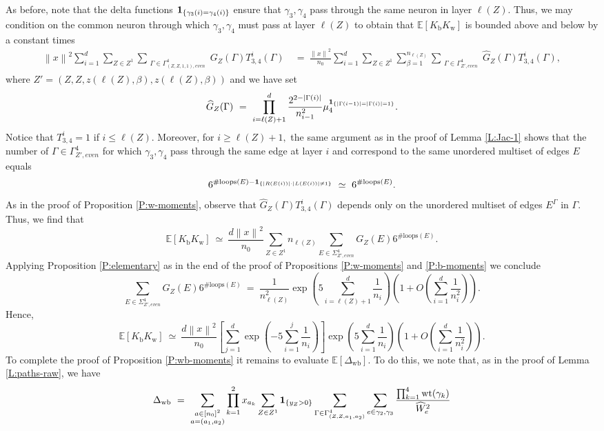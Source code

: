 \documentclass[11pt, reqno]{amsart}
\newcommand{\E}[1]{{\mathbb E}\left [#1\right]}
\newcommand{\abs}[1]{\ensuremath{\left| #1 \right|}}
\newcommand{\lr}[1]{\ensuremath{\left(#1 \right)}}
\newcommand{\norm}[1]{\left\lVert#1\right\rVert}
\newcommand{\set}[1]{\ensuremath{\{#1\}}}
\newcommand{\Kw}{K_{\mathrm{w}}}
\newcommand{\Kb}{K_{\mathrm{b}}}
\newcommand{\Dwb}{\Delta_{\mathrm{wb}}}
\DeclareMathOperator{\wt}{wt}
\begin{document}
As before, note that the delta functions ${\bf 1}_{\set{\gamma_3(i)=\gamma_4(i)}}$ ensure that $\gamma_3,\gamma_4$ pass through the same neuron in layer $\ell(Z).$ Thus, we may condition on the common neuron through which $\gamma_3,\gamma_4$ must pass at layer $\ell(Z)$ to obtain that $\E{\Kb\Kw}$ is bounded above and below by a constant times
\begin{align*}
\norm{x}^2\sum_{i=1}^d\sum_{Z\in Z^1} \sum_{\substack{\Gamma\in \Gamma_{(Z,Z,1,1),{even}}^4}} G_Z(\Gamma)T_{3,4}^i(\Gamma)
 ~&=~ \frac{\norm{x}^2}{n_0}\sum_{i=1}^d\sum_{Z\in Z^1} \sum_{\beta=1}^{n_{\ell(Z)}} \sum_{\substack{\Gamma\in \Gamma_{Z',{even}}^4}} \widehat{G}_{Z}(\Gamma)T_{3,4}^i(\Gamma),
\end{align*}
where $Z'=(Z,Z,z(\ell(Z),\beta),z(\ell(Z),\beta))$ and we have set
\[ \widehat{G}_{Z}(\Gamma)~=~\prod_{i=\ell(Z)+1}^{d}\frac{2^{2-\abs{\Gamma(i)}}}{n_{i-1}^2} \mu_4^{{\bf 1}_{\set{\abs{\Gamma(i-1)}=\abs{\Gamma(i)}=1}}}.\]
Notice that $T_{3,4}^i=1$ if $i\leq \ell(Z).$ Moreover, for $i\geq \ell(Z)+1,$ the same argument as in the proof of Lemma \ref{L:Jac-1} shows that the number of $\Gamma\in \Gamma_{Z',even}^4$ for which $\gamma_3,\gamma_4$ pass through the same edge at layer $i$ and correspond to the same unordered multiset of edges $E$ equals
\[6^{\#\text{loops}(E)-{\bf 1}_{\set{\abs{R(E(i))}\cdot\abs{L(E(i))}\neq1}}}~\simeq~6^{\#\text{loops}(E)}.\]
As in the proof of Proposition \ref{P:w-moments}, observe that $\widehat{G}_{Z}(\Gamma)T_{3,4}^i(\Gamma)$ depends only on the unordered multiset of edges $E^\Gamma$ in $\Gamma$. 
Thus, we find that 
\[\E{\Kb\Kw}~\simeq~\frac{d\norm{x}^2}{n_0}\sum_{Z\in Z^1} n_{\ell(Z)}\sum_{E\in \Sigma_{Z',{even}}^4}G_Z(E) 6^{\#\text{loops}(E)}.\]
Applying Proposition \ref{P:elementary} as in the end of the proof of Propositions \ref{P:w-moments} and \ref{P:b-moments} we conclude
\[\sum_{E\in \Sigma_{Z',{even}}^4}G_Z(E) 6^{\#\text{loops}(E)}~=~\frac{1}{n_{\ell(Z)}^2}\exp\lr{5\sum_{i=\ell(Z)+1}^d \frac{1}{n_i}}\lr{1+O\lr{\sum_{i=1}^d \frac{1}{n_i^2}}}.\]
Hence, 
\[\E{\Kb\Kw}~\simeq~\frac{d\norm{x}^2}{n_0} \left[\sum_{j=1}^d \exp\lr{-5 \sum_{i=1}^j \frac{1}{n_i}}\right] \exp\lr{5\sum_{i=1}^d\frac{1}{n_i}}\lr{1+O\lr{\sum_{i=1}^d\frac{1}{n_i^2}}}.\]
To complete the proof of Proposition \ref{P:wb-moments} it remains to evaluate $\E{\Dwb}.$ To do this, we note that, as in the proof of Lemma \ref{L:paths-raw}, we have
\[\Dwb~=~\sum_{\substack{a\in [n_0]^2\\ a=(a_1,a_2)}}\prod_{k=1}^2x_{a_k} \sum_{Z\in Z^1}{\bf 1}_{\set{y_Z>0}}\sum_{\Gamma\in \Gamma_{(Z,Z,a_1,a_2)}^4}\sum_{e\in \gamma_2,\gamma_3} \frac{\prod_{k=1}^4 \wt(\gamma_k)}{\widehat{W}_e^2}\]
\end{document}
